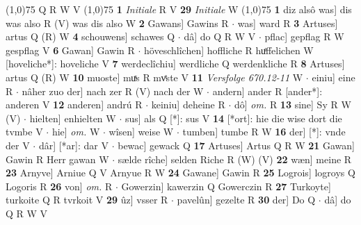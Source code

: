 \documentclass[8pt,a4paper,notitlepage]{article}
\begin{document}
\begin{table}[ht]
\begin{minipage}[t]{0.5\linewidth}
\begin{tabular}{rl}
\end{tabular}
\scriptsize
\line(1,0){75} \newline
Q R W V \newline
\line(1,0){75} \newline
\textbf{1} \textit{Initiale} R V  \textbf{29} \textit{Initiale} W  \newline
\line(1,0){75} \newline
\textbf{1} diz alsô was] dis was also R (V) was dis also W \textbf{2} Gawans] Gawins R  $\cdot$ was] ward R \textbf{3} Artuses] artus Q (R) W \textbf{4} schouwens] schawes Q  $\cdot$ dâ] do Q R W V  $\cdot$ pflac] gepflag R W gespflag V \textbf{6} Gawan] Gawin R  $\cdot$ höveschlîchen] hoffliche R huͤffelichen W [hoveliche*]: hoveliche V \textbf{7} werdeclîchiu] werdliche Q werdenkliche R \textbf{8} Artuses] artus Q (R) W \textbf{10} muoste] muͯs R mvͤste V \textbf{11} \textit{Versfolge 670.12-11} W   $\cdot$ einiu] eine R  $\cdot$ nâher zuo der] nach zer R (V) nach der W  $\cdot$ andern] ander R [ander*]: anderen V \textbf{12} anderen] andrú R  $\cdot$ keiniu] deheine R  $\cdot$ dô] \textit{om.} R \textbf{13} sine] Sy R W (V)  $\cdot$ hielten] enhielten W  $\cdot$ sus] als Q [*]: sus V \textbf{14} [*ort]: hie die wise dort die tvmbe V  $\cdot$ hie] \textit{om.} W  $\cdot$ wîsen] weise W  $\cdot$ tumben] tumbe R W \textbf{16} der] [*]: vnde der V  $\cdot$ dâr] [*ar]: dar V  $\cdot$ bewac] gewack Q \textbf{17} Artuses] Artus Q R W \textbf{21} Gawan] Gawin R Herr gawan W  $\cdot$ sælde rîche] selden Riche R (W) (V) \textbf{22} wæn] meine R \textbf{23} Arnyve] Arniue Q V Arnyue R W \textbf{24} Gawane] Gawin R \textbf{25} Logrois] logroys Q Logoris R \textbf{26} von] \textit{om.} R  $\cdot$ Gowerzin] kawerzin Q Gowerczin R \textbf{27} Turkoyte] turkoite Q R tvrkoit V \textbf{29} ûz] vsser R  $\cdot$ pavelûn] gezelte R \textbf{30} der] Do Q  $\cdot$ dâ] do Q R W V \newline
\end{minipage}
\end{table}
\end{document}
